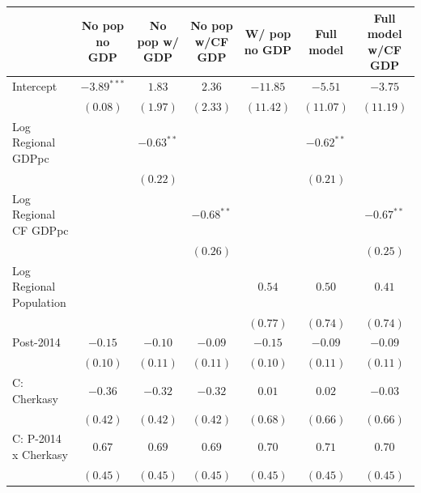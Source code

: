 
\begin{table}
\begin{center}
\begin{small}
\begin{tabular}{l c c c c c c}
\hline
 & No pop
no GDP & No pop
w/ GDP & No pop 
w/CF GDP & W/ pop
no GDP & Full model & Full model w/CF GDP \\
\hline
Intercept                   & $-3.89^{***}$ & $1.83$        & $2.36$        & $-11.85$     & $-5.51$      & $-3.75$      \\
                            & $(0.08)$      & $(1.97)$      & $(2.33)$      & $(11.42)$    & $(11.07)$    & $(11.19)$    \\
Log Regional GDPpc          &               & $-0.63^{**}$  &               &              & $-0.62^{**}$ &              \\
                            &               & $(0.22)$      &               &              & $(0.21)$     &              \\
Log Regional CF GDPpc       &               &               & $-0.68^{**}$  &              &              & $-0.67^{**}$ \\
                            &               &               & $(0.26)$      &              &              & $(0.25)$     \\
Log Regional Population     &               &               &               & $0.54$       & $0.50$       & $0.41$       \\
                            &               &               &               & $(0.77)$     & $(0.74)$     & $(0.74)$     \\
Post-2014                   & $-0.15$       & $-0.10$       & $-0.09$       & $-0.15$      & $-0.09$      & $-0.09$      \\
                            & $(0.10)$      & $(0.11)$      & $(0.11)$      & $(0.10)$     & $(0.11)$     & $(0.11)$     \\
C: Cherkasy                 & $-0.36$       & $-0.32$       & $-0.32$       & $0.01$       & $0.02$       & $-0.03$      \\
                            & $(0.42)$      & $(0.42)$      & $(0.42)$      & $(0.68)$     & $(0.66)$     & $(0.66)$     \\
C: P-2014 x Cherkasy        & $0.67$        & $0.69$        & $0.69$        & $0.70$       & $0.71$       & $0.70$       \\
                            & $(0.45)$      & $(0.45)$      & $(0.45)$      & $(0.45)$     & $(0.45)$     & $(0.45)$     \\

\end{tabular}
\end{small}
\end{center}
\end{table}
